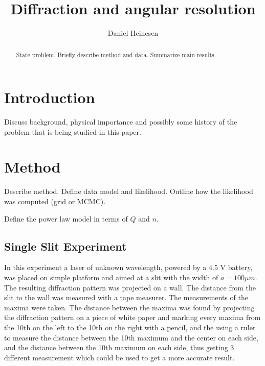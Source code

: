 \documentclass{emulateapj}
\begin{document}
\title{Diffraction and angular resolution}

\author{Daniel Heinesen}





\begin{abstract}
  State problem. Briefly describe method and data. Summarize main results.
\end{abstract}

\section{Introduction}
\label{sec:introduction}

Discuss background, physical importance and possibly some history of
the problem that is being studied in this paper.


\section{Method}
\label{sec:method}


Describe method. Define data model and likelihood. Outline how the
likelihood was computed (grid or MCMC).

Define the power law model in terms of $Q$ and $n$. 


\subsection{Single Slit Experiment}
In this experiment a laser of unknown wavelength, powered by a 4.5 V battery, was placed on simple platform and aimed at a slit with the width of  $a = 100\mu m$. The resulting diffraction pattern was projected on a wall. The distance from the slit to the wall was measured with a tape measurer. The measurements of the maxima were taken. The distance between the maxima was found by projecting the diffraction pattern on a piece of white paper and marking every maxima from the 10th on the left to the 10th on the right with a pencil, and the using a ruler to measure the distance between the 10th maximum and the center on each side, and the distance between the 10th maximum on each side, thus getting 3 different measurement which could be used to get a more accurate result.\\
\end{document}
